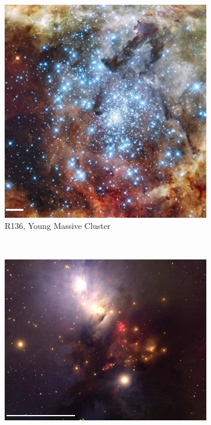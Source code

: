 \begin{figure}
	 \begin{subfigure}[b]{0.415\textwidth}
        \includegraphics[width=\textwidth]{Figures/0_R136_scale.jpg}
        \caption{R136, Young Massive Cluster}
        \label{Fig:0_openglobular2.ymc}
    \end{subfigure}
    ~ 
    \begin{subfigure}[b]{0.55\textwidth}
        \includegraphics[width=\textwidth]{Figures/0_NGC1333_scale_contrast.jpg}

\end{subfigure}
\end{figure}
